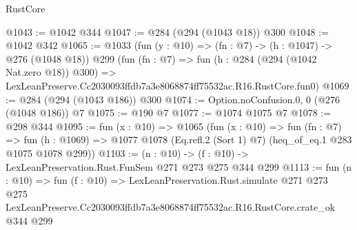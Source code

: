 \begin{lexlean}{RustCore}
\begin{coremodule}
@1043 := @1042 @344
@1047 := @284 (@294 (@1043 @18)) @300
@1048 := @1042 @342
@1065 := @1033
    (fun (y : @10) => (fn : @7) -> (h : @1047) -> @276 (@1048 @18))
    @299
    (fun (fn : @7) =>
    fun (h : @284 (@294 (@1042 Nat.zero @18)) @300) =>
    LexLeanPreserve.Cc2030093ffdb7a3e8068874ff75532ac.R16.RustCore.fun0)
@1069 := @284 (@294 (@1043 @186)) @300
@1074 := Option.noConfusion.{0, 0} (@276 (@1048 @186)) @7
@1075 := @190 @7
@1077 := @1074 @1075 @7
@1078 := @298 @344
@1095 := fun (x : @10) =>
  @1065
    (fun (x : @10) =>
    fun (fn : @7) =>
    fun (h : @1069) => @1077 @1078 (Eq.refl.{2} (Sort 1) @7) (heq_of_eq.{1} @283 @1075 @1078 @299))
@1103 := (n : @10) -> (f : @10) -> LexLeanPreservation.Rust.FunSem @271 @273 @275 @344 @299
@1113 := fun (n : @10) =>
  fun (f : @10) =>
  LexLeanPreservation.Rust.simulate
    @271
    @273
    @275
    LexLeanPreserve.Cc2030093ffdb7a3e8068874ff75532ac.R16.RustCore.crate_ok
    @344
    @299
\end{coremodule}
\end{lexlean}
